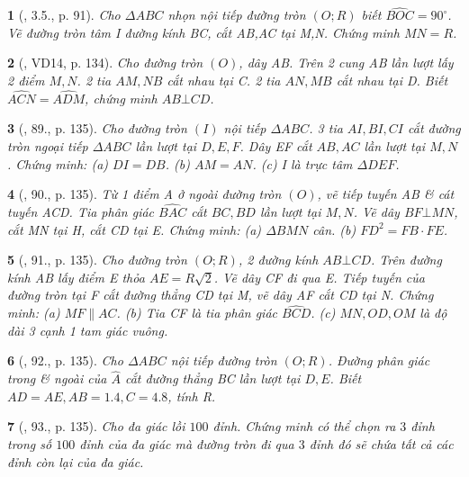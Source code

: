 \documentclass{article}
\newtheorem{baitoan}{}
\begin{document}
\begin{baitoan}[\cite{Binh_boi_duong_Toan_9_tap_2}, 3.5., p. 91]
	Cho $\Delta ABC$ nhọn nội tiếp đường tròn $(O;R)$ biết $\widehat{BOC} = 90^\circ$. Vẽ đường tròn tâm I đường kính BC, cắt AB,AC tại M,N. Chứng minh $MN = R$.
\end{baitoan}

\begin{baitoan}[\cite{Tuyen_Toan_9_old}, VD14, p. 134]
	Cho đường tròn $(O)$, dây AB. Trên 2 cung AB lần lượt lấy 2 điểm $M,N$. 2 tia $AM,NB$ cắt nhau tại C. 2 tia $AN,MB$ cắt nhau tại D. Biết $\widehat{ACN} = \widehat{ADM}$, chứng minh $AB\bot CD$.
\end{baitoan}

\begin{baitoan}[\cite{Tuyen_Toan_9_old}, 89., p. 135]
	Cho đường tròn $(I)$ nội tiếp $\Delta ABC$. 3 tia $AI,BI,CI$ cắt đường tròn ngoại tiếp $\Delta ABC$ lần lượt tại $D,E,F$. Dây EF cắt $AB,AC$ lần lượt tại $M,N$. Chứng minh: (a) $DI = DB$. (b) $AM = AN$. (c) I là trực tâm $\Delta DEF$.
\end{baitoan}

\begin{baitoan}[\cite{Tuyen_Toan_9_old}, 90., p. 135]
	Từ 1 điểm A ở ngoài đường tròn $(O)$, vẽ tiếp tuyến AB \& cát tuyến ACD. Tia phân giác $\widehat{BAC}$ cắt $BC,BD$ lần lượt tại $M,N$. Vẽ dây $BF\bot MN$, cắt MN tại H, cắt CD tại E. Chứng minh: (a) $\Delta BMN$ cân. (b) $FD^2 = FB\cdot FE$.
\end{baitoan}

\begin{baitoan}[\cite{Tuyen_Toan_9_old}, 91., p. 135]
	Cho đường tròn $(O;R)$, 2 đường kính $AB\bot CD$. Trên đường kính AB lấy điểm E thỏa $AE = R\sqrt{2}$. Vẽ dây CF đi qua E. Tiếp tuyến của đường tròn tại F cắt đường thẳng CD tại M, vẽ dây AF cắt CD tại N. Chứng minh: (a) $MF\parallel AC$. (b) Tia CF là tia phân giác $\widehat{BCD}$. (c) $MN,OD,OM$ là độ dài 3 cạnh 1 tam giác vuông.
\end{baitoan}

\begin{baitoan}[\cite{Tuyen_Toan_9_old}, 92., p. 135]
	Cho $\Delta ABC$ nội tiếp đường tròn $(O;R)$. Đường phân giác trong \& ngoài của $\widehat{A}$ cắt đường thẳng BC lần lượt tại $D,E$. Biết $AD = AE,AB = 1.4,C = 4.8$, tính R.
\end{baitoan}

\begin{baitoan}[\cite{Tuyen_Toan_9_old}, 93., p. 135]
	Cho đa giác lồi $100$ đỉnh. Chứng minh có thể chọn ra $3$ đỉnh trong số $100$ đỉnh của đa giác mà đường tròn đi qua $3$ đỉnh đó sẽ chứa tất cả các đỉnh còn lại của đa giác.
\end{baitoan}
\end{document}
